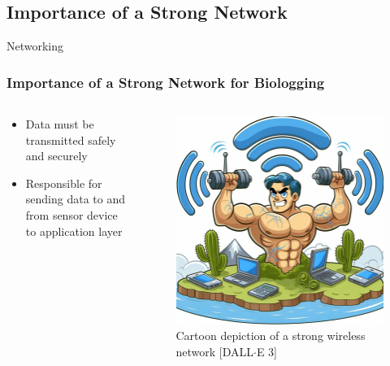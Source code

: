 \documentclass{beamer}
\begin{document}
\subsection{Importance of a Strong Network}
  \begin{frame}{Networking}
    \frametitle{Importance of a Strong Network for Biologging}
    \begin{columns}
      \begin{column}{0.5\textwidth}
        \begin{itemize}
          \item Data must be transmitted safely and securely
          \item Responsible for sending data to and from sensor device to application layer
        \end{itemize}
      \end{column}
      \begin{column}{0.5\textwidth}
        \begin{figure}[htbp]
          \centering
          \includegraphics[width=\textwidth]{StrongNetwork.jpg}
          \caption{Cartoon depiction of a strong wireless network [DALL$\cdot$E 3]}
          \label{fig:Strong_wireless_network}
        \end{figure}
      \end{column}
    \end{columns}
  \end{frame}
\end{document}
